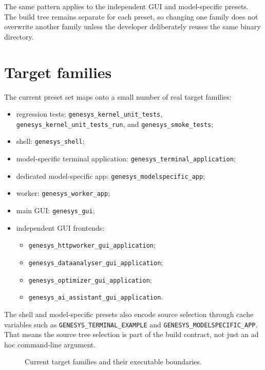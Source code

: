 The same pattern applies to the independent GUI and model-specific presets.
The build tree remains separate for each preset, so changing one family does
not overwrite another family unless the developer deliberately reuses the same
binary directory.

\section{Target families}
\label{sec:dev-target-families}

The current preset set maps onto a small number of real target families:
\begin{itemize}
\item regression tests: \texttt{genesys\_kernel\_unit\_tests},
\texttt{genesys\_kernel\_unit\_tests\_run}, and \texttt{genesys\_smoke\_tests};
\item shell: \texttt{genesys\_shell};
\item model-specific terminal application: \texttt{genesys\_terminal\_application};
\item dedicated model-specific app: \texttt{genesys\_modelspecific\_app};
\item worker: \texttt{genesys\_worker\_app};
\item main GUI: \texttt{genesys\_gui};
\item independent GUI frontends:
\begin{itemize}
\item \texttt{genesys\_httpworker\_gui\_application};
\item \texttt{genesys\_dataanalyser\_gui\_application};
\item \texttt{genesys\_optimizer\_gui\_application};
\item \texttt{genesys\_ai\_assistant\_gui\_application}.
\end{itemize}
\end{itemize}

The shell and model-specific presets also encode source selection through
cache variables such as \texttt{GENESYS\_TERMINAL\_EXAMPLE} and
\texttt{GENESYS\_MODELSPECIFIC\_APP}. That means the source tree selection is
part of the build contract, not just an ad hoc command-line argument.

\begin{figure}[htbp]
\centering
\caption{Current target families and their executable boundaries.}
\label{fig:dev-target-families}
\end{figure}

